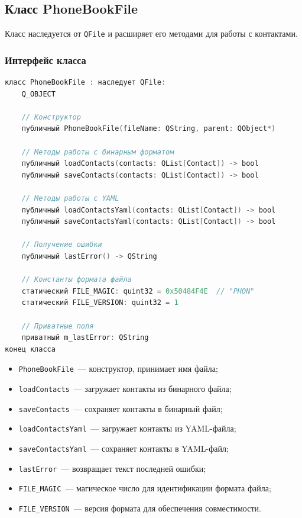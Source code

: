 \subsection{Класс PhoneBookFile}

Класс наследуется от \texttt{QFile} и расширяет его методами для работы с контактами.

\subsubsection*{Интерфейс класса}

\begin{lstlisting}[language=C, caption=Заголовочный файл phonebooktofile.h]
класс PhoneBookFile : наследует QFile:
    Q_OBJECT
    
    // Конструктор
    публичный PhoneBookFile(fileName: QString, parent: QObject*)

    // Методы работы с бинарным форматом
    публичный loadContacts(contacts: QList[Contact]) -> bool
    публичный saveContacts(contacts: QList[Contact]) -> bool
    
    // Методы работы с YAML
    публичный loadContactsYaml(contacts: QList[Contact]) -> bool
    публичный saveContactsYaml(contacts: QList[Contact]) -> bool
    
    // Получение ошибки
    публичный lastError() -> QString

    // Константы формата файла
    статический FILE_MAGIC: quint32 = 0x50484F4E  // "PHON"
    статический FILE_VERSION: quint32 = 1

    // Приватные поля
    приватный m_lastError: QString
конец класса
\end{lstlisting}

\begin{itemize}
    \item \texttt{PhoneBookFile}~--- конструктор, принимает имя файла;
    \item \texttt{loadContacts}~--- загружает контакты из бинарного файла;
    \item \texttt{saveContacts}~--- сохраняет контакты в бинарный файл;
    \item \texttt{loadContactsYaml}~--- загружает контакты из YAML-файла;
    \item \texttt{saveContactsYaml}~--- сохраняет контакты в YAML-файл;
    \item \texttt{lastError}~--- возвращает текст последней ошибки;
    \item \texttt{FILE\_MAGIC}~--- магическое число для идентификации формата файла;
    \item \texttt{FILE\_VERSION}~--- версия формата для обеспечения совместимости.
\end{itemize}

